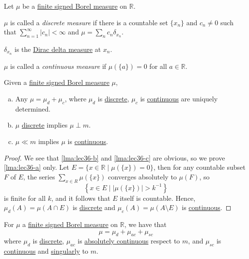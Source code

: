 \begin{definition*}
	Let \(\mu\) be a \hyperref[def:finite-signed-measure]{finite signed \hyperref[def:Borel-measure]{Borel measure}} on \(\mathbb{R}\).
	\begin{definition}\label{def:discrete-measure}
		\(\mu\) is called a \emph{discrete measure} if there is a countable set \(\{x_n\}\) and \(c_n \neq 0\) such that \(\sum_{n=1}^\infty \left\vert c_n \right\vert < \infty\)
		and \(\mu = \sum_n c_n \delta_{x_n}\).
		\begin{note}
			\(\delta_{x_n}\) is the \hyperref[eg:Dirac-Delta measure]{Dirac delta measure} at \(x_n\).
		\end{note}
	\end{definition}
	\begin{definition}\label{def:continuous-measure}
		\(\mu\) is called a \emph{continuous measure} if \(\mu(\{a\}) = 0\) for all \(a \in \mathbb{R}\).
	\end{definition}
\end{definition*}

\begin{lemma}\label{lma:lec36}
	Given a \hyperref[def:finite-signed-measure]{finite signed \hyperref[def:Borel-measure]{Borel measure}} \(\mu\),
	\begin{enumerate}[(a)]
		\item\label{lma:lec36-a} Any \(\mu = \mu_d + \mu_c\), where \(\mu_d\) is \hyperref[def:discrete-measure]{discrete}, \(\mu_c\) is \hyperref[def:continuous-measure]{continuous} are uniquely determined.
		\item\label{lma:lec36-b} \(\mu\) \hyperref[def:discrete-measure]{discrete} implies \(\mu \perp m\).
		\item\label{lma:lec36-c} \(\mu \ll m\) implies \(\mu\) is \hyperref[def:continuous-measure]{continuous}.
	\end{enumerate}
\end{lemma}
\begin{proof}
	We see that \autoref{lma:lec36-b} and \autoref{lma:lec36-c} are obvious, so we prove \autoref{lma:lec36-a} only. Let \(E = \{x\in \mathbb{R} \mid \mu (\{x\}) = 0\}\), then for any countable subset \(F\) of \(E\), the series \(\sum_{x\in R}^{} \mu (\{x\})\) converges absolutely to \(\mu (F)\), so
	\[
		\left\{x\in E\mid \left\vert \mu (\{x\}) \right\vert > k^{-1} \right\}
	\]
	is finite for all \(k\), and it follows that \(E\) itself is countable. Hence, \(\mu _{d} (A) = \mu (A \cap E)\) is \hyperref[def:discrete-measure]{discrete} and \(\mu _{c} (A) = \mu (A \setminus E)\) is \hyperref[def:continuous-measure]{continuous}.
\end{proof}

\begin{corollary}
	For \(\mu \) a \hyperref[def:finite-signed-measure]{finite signed \hyperref[def:Borel-measure]{Borel measure}} on \(\mathbb{R}\), we have that
	\[
		\mu = \mu_d + \mu_{ac} + \mu_{sc}
	\]
	where \(\mu_d\) is \hyperref[def:discrete-measure]{discrete}, \(\mu_{ac}\) is \hyperref[def:absolutely-continuous-function]{absolutely continuous} respect to \(m\), and \(\mu_{sc}\) is \hyperref[def:continuous-measure]{continuous} and \hyperref[def:singular]{singularly} to \(m\).
\end{corollary}